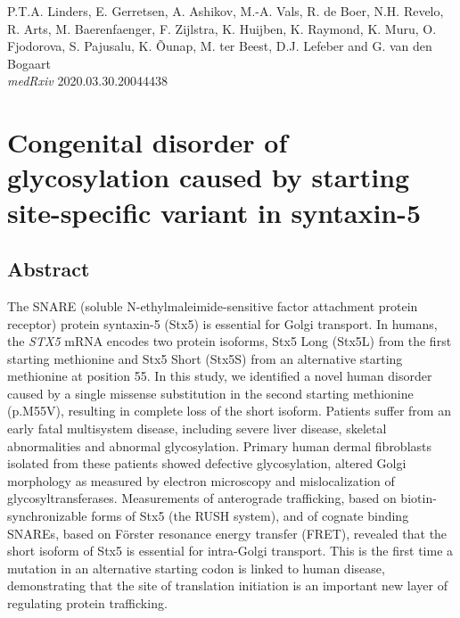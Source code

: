 



\thispagestyle{empty}
\begin{savequote}
    \normalfont\normalsize{P.T.A. Linders, E. Gerretsen, A. Ashikov, M.-A. Vals, R. de Boer, N.H. Revelo, R. Arts, M. Baerenfaenger, F. Zijlstra, K. Huijben, K. Raymond, K. Muru, O. Fjodorova, S. Pajusalu, K. Õunap, M. ter Beest, D.J. Lefeber and G. van den Bogaart\\
        \emph{medRxiv} 2020.03.30.20044438}
\end{savequote}
\chapter{Congenital disorder of glycosylation caused by starting site-specific variant in syntaxin-5}
\stopthumb


\clearpage

\continuethumb
\section{Abstract}

The SNARE (soluble N-ethylmaleimide-sensitive factor attachment protein receptor) protein syntaxin-5 (Stx5) is essential for Golgi transport. In humans, the \emph{STX5} mRNA encodes two protein isoforms, Stx5 Long (Stx5L) from the first starting methionine and Stx5 Short (Stx5S) from an alternative starting methionine at position 55. In this study, we identified a novel human disorder caused by a single missense substitution in the second starting methionine (p.M55V), resulting in complete loss of the short isoform. Patients suffer from an early fatal multisystem disease, including severe liver disease, skeletal abnormalities and abnormal glycosylation. Primary human dermal fibroblasts isolated from these patients showed defective glycosylation, altered Golgi morphology as measured by electron microscopy and mislocalization of glycosyltransferases. Measurements of anterograde trafficking, based on biotin-synchronizable forms of Stx5 (the RUSH system), and of cognate binding SNAREs, based on Förster resonance energy transfer (FRET), revealed that the short isoform of Stx5 is essential for intra-Golgi transport. This is the first time a mutation in an alternative starting codon is linked to human disease, demonstrating that the site of translation initiation is an important new layer of regulating protein trafficking.
\clearpage

